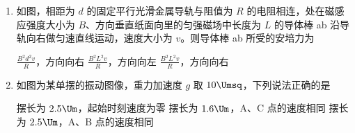 \documentclass[\gkver]{gaokaozhenti}
\begin{document}
\begin{enumerate}
{$mg = G\frac{Mm}{r^{2}} = m\frac{4\pi^{2}}{T^{2}}r$

整理得轨道重力加速度为 $g = \frac{4\pi^{2}}{T^{2}}r$

故通过测量天宫实验室绕地球做匀速圆周运动的周期和轨道半径可行，D 正确。故选 D。
}

\item
如图，相距为 $d$ 的固定平行光滑金属导轨与阻值为 $R$ 的电阻相连，处在磁感应强度大小为 $B$、方向垂直纸面向里的匀强磁场中长度为 $L$ 的导体棒 ab 沿导轨向右做匀速直线运动，速度大小为 $v$。则导体棒 ab 所受的安培力为


{$\frac{B^{2}d^{2}v}{R}$，方向向右}
{$\frac{B^{2}L^{2}v}{R}$，方向向左}
{$\frac{B^{2}L^{2}v}{R}$，方向向右}


\item
如图为某单摆的振动图像，重力加速度 $g$ 取 $10 \Umsq$，下列说法正确的是


{摆长为 $2.5 \Um$，起始时刻速度为零}
{摆长为 $1.6 \Um$，A、C 点的速度相同}
{摆长为 $2.5 \Um$，A、B 点的速度相同}

\end{enumerate}
\end{document}
